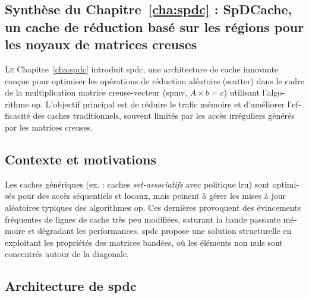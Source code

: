 \begin{otherlanguage}{french}

\addtocounter{synthFCnt}{1}
\section{Synthèse du Chapitre~\ref{cha:spdc} : SpDCache, un cache de réduction basé sur les régions pour les noyaux de matrices creuses}

\lettrine{L}{e} Chapitre~\ref{cha:spdc} introduit \acrlong{spdc}, une architecture de cache innovante conçue pour optimiser les opérations de réduction aléatoire (\gls{scatter}) dans le cadre de la multiplication matrice creuse-vecteur (\acrshort{spmv}, $A \times b = c$) utilisant l'algorithme \acrfull{op}.
L'objectif principal est de réduire le trafic mémoire et d'améliorer l'efficacité des caches traditionnels, souvent limités par les accès irréguliers générés par les matrices creuses.

\subsection*{Contexte et motivations}

Les caches génériques (ex. : caches \textit{set-associatifs} avec politique \acrshort{lru}) sont optimisés pour des accès séquentiels et locaux, mais peinent à gérer les mises à jour aléatoires typiques des algorithmes \acrshort{op}.
Ces dernières provoquent des évincements fréquentes de lignes de cache très peu modifiées, saturant la bande passante mémoire et dégradant les performances.
\acrlong{spdc} propose une solution structurelle en exploitant les propriétés des matrices bandées, où les éléments non nuls sont concentrés autour de la diagonale.

\subsection*{Architecture de \acrlong{spdc}}


\end{otherlanguage}

